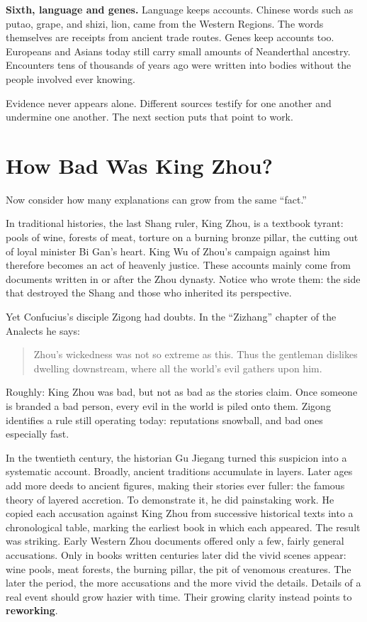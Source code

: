 \textbf{Sixth, language and genes.} Language keeps accounts. Chinese words such as putao, grape, and shizi, lion, came from the Western Regions. The words themselves are receipts from ancient trade routes. Genes keep accounts too. Europeans and Asians today still carry small amounts of Neanderthal ancestry. Encounters tens of thousands of years ago were written into bodies without the people involved ever knowing.

Evidence never appears alone. Different sources testify for one another and undermine one another. The next section puts that point to work.

\section{How Bad Was King Zhou?}
Now consider how many explanations can grow from the same ``fact.''

In traditional histories, the last Shang ruler, King Zhou, is a textbook tyrant: pools of wine, forests of meat, torture on a burning bronze pillar, the cutting out of loyal minister Bi Gan's heart. King Wu of Zhou's campaign against him therefore becomes an act of heavenly justice. These accounts mainly come from documents written in or after the Zhou dynasty. Notice who wrote them: the side that destroyed the Shang and those who inherited its perspective.

Yet Confucius's disciple Zigong had doubts. In the ``Zizhang'' chapter of the Analects he says:

\begin{quote}
Zhou's wickedness was not so extreme as this. Thus the gentleman dislikes dwelling downstream, where all the world's evil gathers upon him.
\end{quote}
Roughly: King Zhou was bad, but not as bad as the stories claim. Once someone is branded a bad person, every evil in the world is piled onto them. Zigong identifies a rule still operating today: reputations snowball, and bad ones especially fast.

In the twentieth century, the historian Gu Jiegang turned this suspicion into a systematic account. Broadly, ancient traditions accumulate in layers. Later ages add more deeds to ancient figures, making their stories ever fuller: the famous theory of layered accretion. To demonstrate it, he did painstaking work. He copied each accusation against King Zhou from successive historical texts into a chronological table, marking the earliest book in which each appeared. The result was striking. Early Western Zhou documents offered only a few, fairly general accusations. Only in books written centuries later did the vivid scenes appear: wine pools, meat forests, the burning pillar, the pit of venomous creatures. The later the period, the more accusations and the more vivid the details. Details of a real event should grow hazier with time. Their growing clarity instead points to \textbf{reworking}.

